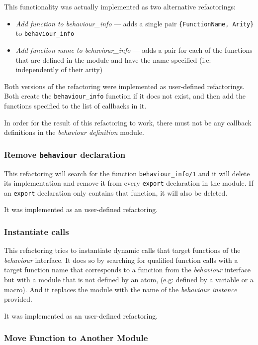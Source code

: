 This functionality was actually implemented as two alternative refactorings:
\begin{itemize}
\item \emph{Add function to behaviour\_info} --- adds a single pair \texttt{\{FunctionName,
Arity\}} to \texttt{behaviour\_info}
\item \emph{Add function name to behaviour\_info} --- adds a pair for each
of the functions that are defined in the module and have the name
specified (i.e: independently of their arity)
\end{itemize}
Both versions of the refactoring were implemented as user-defined
refactorings. Both create the \texttt{behaviour\_info} function if
it does not exist, and then add the functions specified to the list
of callbacks in it.

In order for the result of this refactoring to work, there must not
be any callback definitions in the \emph{behaviour definition} module.


\subsubsection{Remove \texttt{behaviour} declaration\label{sub:remove_behav_dec}}

This refactoring will search for the function \texttt{behaviour\_info/1}
and it will delete its implementation and remove it from every \texttt{export}
declaration in the module. If an \texttt{export} declaration only
contains that function, it will also be deleted.

It was implemented as an user-defined refactoring.


\subsubsection{Instantiate calls\label{sub:instantiate_calls}}

This refactoring tries to instantiate dynamic calls that target functions
of the \emph{behaviour} interface. It does so by searching for qualified
function calls with a target function name that corresponds to a function
from the \emph{behaviour} interface but with a module that is not
defined by an atom, (e.g: defined by a variable or a macro). And it
replaces the module with the name of the \emph{behaviour instance}
provided.

It was implemented as an user-defined refactoring.


\subsubsection{Move Function to Another Module\label{sub:move_fun}}

